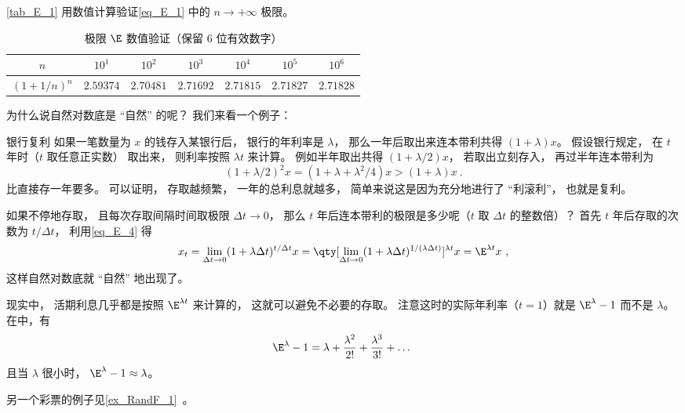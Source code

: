 \autoref{tab_E_1} 用数值计算验证\autoref{eq_E_1} 中的 $n\to+\infty$ 极限。
\begin{table}[ht]
\centering
\caption{极限 $\E$ 数值验证（保留 6 位有效数字）}\label{tab_E_1}
\begin{tabular}{|c|c|c|c|c|c|c|}
\hline
$n$ & $10^{1}$ & $10^{2}$ & $10^{3}$ & $10^{4}$ & $10^{5}$ & $10^{6}$ \\
\hline
$(1 + 1/n)^n$ & $2.59374$ & $2.70481$ & $2.71692$ & $2.71815$ & $2.71827$ & $2.71828$ \\
\hline
\end{tabular}
\end{table}

为什么说自然对数底是 “自然” 的呢？ 我们来看一个例子：

\begin{example}{银行复利}
如果一笔数量为 $x$ 的钱存入某银行后， 银行的年利率是 $\lambda$， 那么一年后取出来连本带利共得 $(1+\lambda)x$。 假设银行规定， 在 $t$ 年时（$t$ 取任意正实数） 取出来， 则利率按照 $\lambda t$ 来计算。 例如半年取出共得 $(1+\lambda/2)x$， 若取出立刻存入， 再过半年连本带利为
\begin{equation}
(1+\lambda/2)^2 x = (1 + \lambda + \lambda^2/4)x > (1 + \lambda) x~.
\end{equation}
比直接存一年要多。 可以证明， 存取越频繁， 一年的总利息就越多， 简单来说这是因为充分地进行了 “利滚利”， 也就是复利。

如果不停地存取， 且每次存取间隔时间取极限 $\Delta t \to 0$， 那么 $t$ 年后连本带利的极限是多少呢（$t$ 取 $\Delta t$ 的整数倍）？ 首先 $t$ 年后存取的次数为 $t/\Delta t$， 利用\autoref{eq_E_4} 得
\begin{equation}
x_t = \lim_{\Delta t\to 0}(1 + \lambda \Delta t)^{t/\Delta t} x
= \qty[\lim_{\Delta t\to 0}(1 + \lambda \Delta t)^{1/(\lambda \Delta t)}]^{\lambda t} x
= \E^{\lambda t} x~,
\end{equation}
这样自然对数底就 “自然” 地出现了。

现实中， 活期利息几乎都是按照 $\E^{\lambda t}$ 来计算的， 这就可以避免不必要的存取。 注意这时的实际年利率（$t = 1$）就是 $\E^\lambda - 1$ 而不是 $\lambda$。 在中，有
\begin{equation}
\E^\lambda - 1 = \lambda + \frac{\lambda^2}{2!} + \frac{\lambda^3}{3!} + \dots~
\end{equation}
且当 $\lambda$ 很小时， $\E^\lambda - 1 \approx \lambda$。
\end{example}

另一个彩票的例子见\autoref{ex_RandF_1}~。
